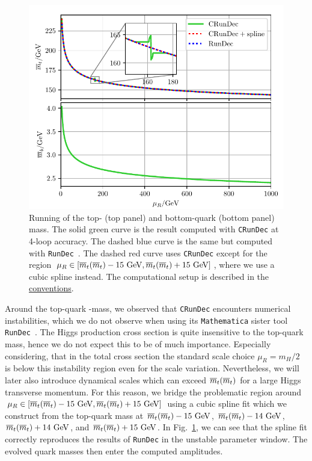 \begin{figure}[h]
\centering
\includegraphics[width=\figurewidth]{Images/mass_running.pdf}
\caption{Running of the top- (top panel) and bottom-quark (bottom panel) mass. The solid green curve is the result computed with \texttt{CRunDec} at 4-loop accuracy. The dashed blue curve is the same but computed with \texttt{RunDec}~\cite{Chetyrkin:2000yt}. The dashed red curve uses \texttt{CRunDec} except for the region $\mu_R \in [\msMass{t}-15 \ \mathrm{GeV}, \msMass{t} + 15 \ \mathrm{GeV}]$, where we use a cubic spline instead. The computational setup is described in the \hyperref[chap:notation_and_conventions]{conventions}.}
\label{fig:5:running}
\end{figure}
Around the top-quark \MS-mass, we observed that \texttt{CRunDec} encounters numerical instabilities, which we do not observe when using its \texttt{Mathematica} sister tool \texttt{RunDec}~\cite{Chetyrkin:2000yt}. The Higgs production cross section is quite insensitive to the top-quark mass, hence we do not expect this to be of much importance. Especially considering, that in the total cross section the standard scale choice $\mu_R = m_H/2$ is below this instability region even for the scale variation. Nevertheless, we will later also introduce dynamical scales which can exceed $\overline{m}_{t}\!\left(\overline{m}_{t} \right)$ for a large Higgs transverse momentum. For this reason, we bridge the problematic region around $\mu_R \in [\msMass{t} - 15 \ \mathrm{GeV}, \msMass{t} + 15\ \mathrm{GeV}]$ using a cubic spline fit which we construct from the top-quark mass at $\overline{m}_{t}\!\left(\overline{m}_{t} \right) - 15 \ \mathrm{GeV}$, $\overline{m}_{t}\!\left(\overline{m}_{t} \right) - 14 \ \mathrm{GeV}$,$\overline{m}_{t}\!\left(\overline{m}_{t} \right) + 14 \ \mathrm{GeV}$, and $\overline{m}_{t}\!\left(\overline{m}_{t} \right) + 15 \ \mathrm{GeV}$. In Fig.~\ref{fig:5:running}, we can see that the spline fit correctly reproduces the results of \texttt{RunDec} in the unstable parameter window. The evolved quark masses then enter the computed amplitudes.

